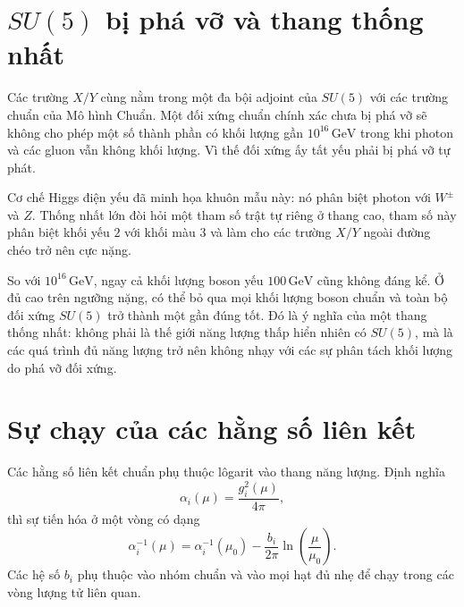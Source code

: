\section{\texorpdfstring{\(SU(5)\)}{SU(5)} bị phá vỡ và thang thống nhất}

Các trường \(X/Y\) cùng nằm trong một đa bội adjoint của \(SU(5)\) với các trường chuẩn của Mô hình Chuẩn. Một đối xứng chuẩn chính xác chưa bị phá vỡ sẽ không cho phép một số thành phần có khối lượng gần \(10^{16}\,\mathrm{GeV}\) trong khi photon và các gluon vẫn không khối lượng. Vì thế đối xứng ấy tất yếu phải bị phá vỡ tự phát.

\begin{classroomqa}
\end{classroomqa}

Cơ chế Higgs điện yếu đã minh họa khuôn mẫu này: nó phân biệt photon với \(W^\pm\) và \(Z\). Thống nhất lớn đòi hỏi một tham số trật tự riêng ở thang cao, tham số này phân biệt khối yếu \(2\) với khối màu \(3\) và làm cho các trường \(X/Y\) ngoài đường chéo trở nên cực nặng.

So với \(10^{16}\,\mathrm{GeV}\), ngay cả khối lượng boson yếu \(100\,\mathrm{GeV}\) cũng không đáng kể. Ở đủ cao trên ngưỡng nặng, có thể bỏ qua mọi khối lượng boson chuẩn và toàn bộ đối xứng \(SU(5)\) trở thành một gần đúng tốt. Đó là ý nghĩa của một thang thống nhất: không phải là thế giới năng lượng thấp hiển nhiên có \(SU(5)\), mà là các quá trình đủ năng lượng trở nên không nhạy với các sự phân tách khối lượng do phá vỡ đối xứng.

\section{Sự chạy của các hằng số liên kết}

Các hằng số liên kết chuẩn phụ thuộc lôgarit vào thang năng lượng. Định nghĩa
\begin{equation}
\alpha_i(\mu)=\frac{g_i^2(\mu)}{4\pi},
\end{equation}
thì sự tiến hóa ở một vòng có dạng
\begin{equation}
\alpha_i^{-1}(\mu)
=
\alpha_i^{-1}(\mu_0)
-\frac{b_i}{2\pi}
\ln\!\left(\frac{\mu}{\mu_0}\right).
\label{eq:l10-running}
\end{equation}
Các hệ số \(b_i\) phụ thuộc vào nhóm chuẩn và vào mọi hạt đủ nhẹ để chạy trong các vòng lượng tử liên quan.

